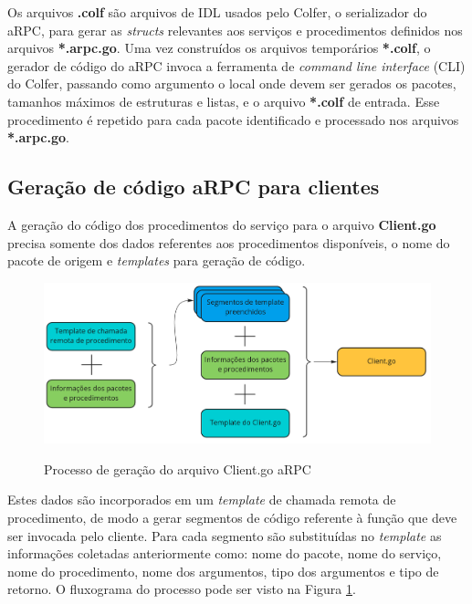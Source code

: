 Os arquivos \textbf{.colf} são arquivos de IDL usados pelo Colfer, o serializador do aRPC, para gerar as \textit{structs} relevantes aos serviços e procedimentos definidos nos arquivos \textbf{*.arpc.go}. Uma vez construídos os arquivos temporários \textbf{*.colf}, o gerador de código do aRPC invoca a ferramenta de \textit{command line interface} (CLI) do Colfer, passando como argumento o local onde devem ser gerados os pacotes, tamanhos máximos de estruturas e listas, e o arquivo \textbf{*.colf} de entrada. Esse procedimento é repetido para cada pacote identificado e processado nos arquivos \textbf{*.arpc.go}.

\subsection{Geração de código aRPC para clientes}

A geração do código dos procedimentos do serviço para o arquivo \textbf{Client.go} precisa somente dos dados referentes aos procedimentos disponíveis, o nome do pacote de origem e \textit{templates} para geração de código.

\begin{figure}[ht]
    \centering
    \caption{Processo de geração do arquivo Client.go aRPC}
    \includegraphics[width=\textwidth]{figuras/diagramas/cap3/arpc_compilador_client_go_gen.png}
    \label{fig:arpc_compiler_client_go_gen}
\end{figure}

Estes dados são incorporados em um \textit{template} de chamada remota de procedimento, de modo a gerar segmentos de código referente à função que deve ser invocada pelo cliente. Para cada segmento são substituídas no \textit{template} as informações coletadas anteriormente como: nome do pacote, nome do serviço, nome do procedimento, nome dos argumentos, tipo dos argumentos e tipo de retorno. O fluxograma do processo pode ser visto na Figura \ref{fig:arpc_compiler_client_go_gen}. 


